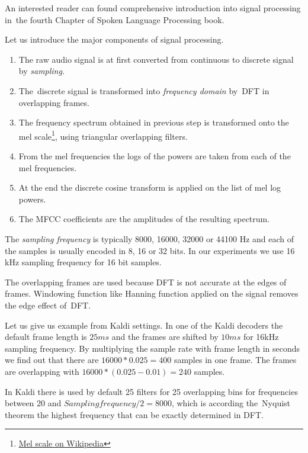 An interested reader can found comprehensive introduction into signal processing in~the fourth Chapter of Spoken Language Processing book\cite{huang2001spoken}.

Let us introduce the major components of signal processing. 
\begin{enumerate}
    \item The raw audio signal is at first converted from continuous to discrete signal by {\it sampling}.  %
    \item The~discrete signal is transformed into {\it frequency domain}\/ by~\ac{DFT} in overlapping frames.
    \item The frequency spectrum obtained in previous step is transformed onto the mel scale\footnote{\href{https://en.wikipedia.org/wiki/Mel_scale}{Mel scale on Wikipedia}}, using triangular overlapping filters.
    \item From the mel frequencies the logs of the powers are taken from each of the mel frequencies.
    \item At the end the discrete cosine transform is applied on the list of mel log powers.
    \item The \ac{MFCC} coefficients are the amplitudes of the resulting spectrum.
\end{enumerate}
The {\it sampling frequency}\/ is typically 8000, 16000, 32000 or 44100 Hz and each of the samples is usually encoded in 8, 16 or 32 bits. In our experiments we use 16 kHz sampling frequency for 16 bit samples.  

The overlapping frames are used because \ac{DFT} is not accurate at the edges of frames. 
Windowing function like Hanning function applied on the signal removes the edge effect of~\ac{DFT}. 

Let us give us example from Kaldi settings. In one of the Kaldi decoders the default frame length is $25ms$ and the frames are shifted by $10ms$ for 16kHz sampling frequency. By multiplying the sample rate with frame length in seconds we find out that there are $16000 * 0.025 = 400$ samples in one frame. The frames are overlapping with $ 16000 * (0.025 - 0.01) = 240$ samples.

In Kaldi there is used by default 25 filters for 25 overlapping bins for frequencies between 20 and $Sampling frequency / 2 = 8000$, which is according the~Nyquist theorem\cite{jerri1977shannon} the highest frequency that can be exactly determined in \ac{DFT}. 

